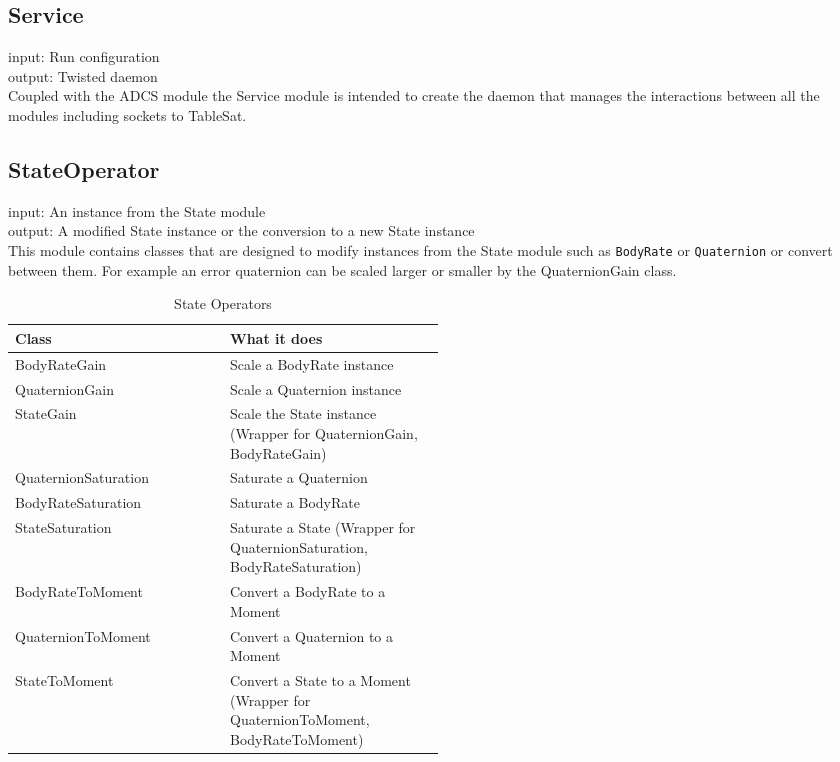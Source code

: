 \subsection{Service}
\label{subsec:Service}

input: Run configuration\\
output: Twisted daemon\\

Coupled with the ADCS module the Service module is intended to create the daemon that manages the interactions between all the modules including sockets to TableSat.


\subsection{StateOperator}
\label{subsec:StateOperator}

input: An instance from the State module\\
output: A modified State instance or the conversion to a new State instance\\

This module contains classes that are designed to modify instances from the State module such as \verb|BodyRate| or \verb|Quaternion| or convert between them. For example an error quaternion can be scaled larger or smaller by the QuaternionGain class.

\begin{table}[H]
  \centering
  \begin{tabular}{l|p{0.5\linewidth}}
    Class &  What it does \\ \hline
    BodyRateGain & Scale a BodyRate instance\\
    QuaternionGain & Scale a Quaternion instance\\
    StateGain &  Scale the State instance (Wrapper for QuaternionGain, BodyRateGain)\\
    QuaternionSaturation & Saturate a Quaternion\\
    BodyRateSaturation & Saturate a BodyRate\\
    StateSaturation  & Saturate a State (Wrapper for QuaternionSaturation, BodyRateSaturation)\\
    BodyRateToMoment & Convert a BodyRate to a Moment\\
    QuaternionToMoment & Convert a Quaternion to a Moment\\
    StateToMoment  & Convert a State to a Moment (Wrapper for QuaternionToMoment, BodyRateToMoment)\\
  \end{tabular}
  \caption{State Operators}
  \label{tbl:StateOperators}
\end{table}



